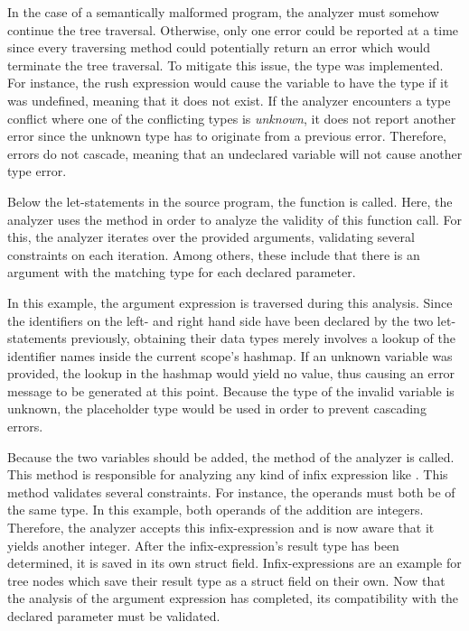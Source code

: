 In the case of a semantically malformed program, the analyzer must somehow continue the tree traversal.
Otherwise, only one error could be reported at a time since every traversing method could potentially return an error which would terminate the tree traversal.
To mitigate this issue, the  type was implemented.
For instance, the rush expression  would cause the  variable to have the  type if it was undefined, meaning that it does not exist.
If the analyzer encounters a type conflict where one of the conflicting types is \emph{unknown},
it does not report another error since the unknown type has to originate from a previous error.
Therefore, errors do not cascade, meaning that an undeclared variable will not cause another type error.

Below the let-statements in the source program, the  function is called.
Here, the analyzer uses the  method in order to analyze the validity of this function call.
For this, the analyzer iterates over the provided arguments, validating several constraints on each iteration.
Among others, these include that there is an argument with the matching type for each declared parameter.

In this example, the argument expression  is traversed during this analysis.
Since the identifiers on the left- and right hand side have been declared by the two let-statements previously,
obtaining their data types merely involves a lookup of the identifier names inside the current scope's hashmap.
If an unknown variable was provided, the lookup in the hashmap would yield no value, thus causing an error message to be generated at this point.
Because the type of the invalid variable is unknown, the placeholder  type would be used in order to prevent cascading errors.

Because the two variables should be added, the method  of the analyzer is called.
This method is responsible for analyzing any kind of infix expression like .
This method validates several constraints.
For instance, the operands must both be of the same type.
In this example, both operands of the addition are integers.
Therefore, the analyzer accepts this infix-expression and is now aware that it yields another integer.
After the infix-expression's result type has been determined, it is saved in its own  struct field.
Infix-expressions are an example for tree nodes which save their result type as a struct field on their own.
Now that the analysis of the argument expression has completed, its compatibility with the declared parameter must be validated.

